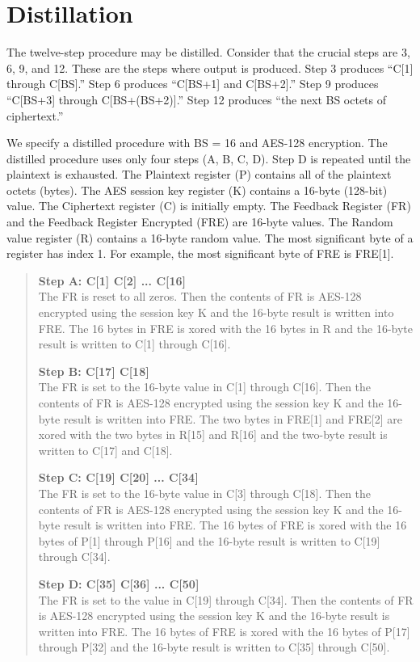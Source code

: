 \documentclass{article}
\begin{document}
\section*{Distillation}

The twelve-step procedure may be distilled.
Consider that the crucial steps are 3, 6, 9, and 12.
These are the steps where output is produced.
Step 3 produces ``C[1] through C[BS].''
Step 6 produces ``C[BS+1] and C[BS+2].''
Step 9 produces ``C[BS+3] through C[BS+(BS+2)].''
Step 12 produces ``the next BS octets of ciphertext.''

We specify a distilled procedure with BS = 16 and AES-128 encryption.
The distilled procedure uses only four steps (A, B, C, D).
Step D is repeated until the plaintext is exhausted.
The Plaintext register (P) contains all of the plaintext octets (bytes).
The AES session key register (K) contains a 16-byte (128-bit) value.
The Ciphertext register (C) is initially empty.
The Feedback Register (FR) and the Feedback Register Encrypted (FRE) are 16-byte values.
The Random value register (R) contains a 16-byte random value.
The most significant byte of a register has index 1.
For example, the most significant byte of FRE is FRE[1].

\begin{quote}
\textbf{Step A: C[1] C[2] ... C[16]}\\
The FR is reset to all zeros.
Then the contents of FR is AES-128 encrypted using the session key K
and the 16-byte result is written into FRE.
The 16 bytes in FRE is xored with the 16 bytes in R
and the 16-byte result is written to C[1] through C[16].
\vspace{2ex}

\textbf{Step B: C[17] C[18]}\\
The FR is set to the 16-byte value in C[1] through C[16].
Then the contents of FR is AES-128 encrypted using the session key K
and the 16-byte result is written into FRE.
The two bytes in FRE[1] and FRE[2] are xored with the two bytes in R[15] and R[16]
and the two-byte result is written to C[17] and C[18].
\vspace{2ex}

\textbf{Step C: C[19] C[20] ... C[34]}\\
The FR is set to the 16-byte value in C[3] through C[18].
Then the contents of FR is AES-128 encrypted using the session key K
and the 16-byte result is written into FRE.
The 16 bytes of FRE is xored with the 16 bytes of P[1] through P[16]
and the 16-byte result is written to C[19] through C[34].
\vspace{2ex}

\textbf{Step D: C[35] C[36] ... C[50]}\\
The FR is set to the value in C[19] through C[34].
Then the contents of FR is AES-128 encrypted using the session key K
and the 16-byte result is written into FRE.
The 16 bytes of FRE is xored with the 16 bytes of P[17] through P[32]
and the 16-byte result is written to C[35] through C[50].
\end{quote}
\end{document}
